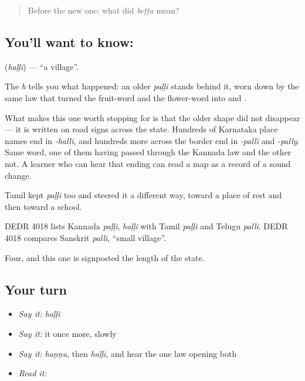 \label{lesson:KA-C55-village}



\begin{quote}
Before the new one: what did \emph{beṭṭa} mean?
\end{quote}

\subsection*{You'll want to know: }
\textbf{} (\emph{haḷḷi}) — \textquotedblleft{}a village\textquotedblright{}.

The \emph{h} tells you what happened: an older \emph{paḷḷi} stands behind it, worn down by the same law that turned the fruit-word and the flower-word into  and .

What makes this one worth stopping for is that the older shape did not disappear — it is written on road signs across the state. Hundreds of Karnataka place names end in \emph{-halli}, and hundreds more across the border end in \emph{-palli} and \emph{-pally}. Same word, one of them having passed through the Kannada law and the other not. A learner who can hear that ending can read a map as a record of a sound change.

Tamil kept \emph{paḷḷi} too and steered it a different way, toward a place of rest and then toward a school.

DEDR 4018 lists Kannada \emph{paḷḷi}, \emph{haḷḷi} with Tamil \emph{paḷḷi} and Telugu \emph{palli}. DEDR 4018 compares Sanskrit \emph{pallī}, \textquotedblleft{}small village\textquotedblright{}.

\begin{grammarlens}[title={What you've built}]
Four, and this one is signposted the length of the state.
\end{grammarlens}

\subsection*{Your turn}
\begin{itemize}
\raggedright
  \item \emph{Say it:} \emph{haḷḷi}
  \item \emph{Say it:} it once more, slowly
  \item \emph{Say it:} \emph{haṇṇu}, then \emph{haḷḷi}, and hear the one law opening both
  \item \emph{Read it:} \textbf{}
\end{itemize}

